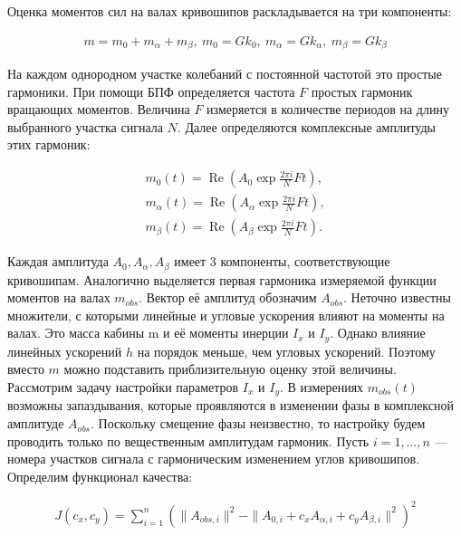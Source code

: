 Оценка моментов сил на валах кривошипов раскладывается на три компоненты:

\begin{equation}
\begin{aligned}
	m = m_0 + m_{\alpha} + m_{\beta},~m_0 = Gk_0,~m_{\alpha} = Gk_{\alpha},~m_{\beta} = Gk_{\beta}
\end{aligned}
\end{equation}

На каждом однородном участке колебаний с постоянной частотой это простые гармоники. При помощи БПФ определяется частота $F$ простых гармоник вращающих моментов. Величина $F$ измеряется в количестве периодов на длину выбранного участка сигнала $N$.
Далее определяются комплексные амплитуды этих гармоник:

\begin{equation}
\begin{aligned}
	m_0(t) = \operatorname{Re}\left(A_0 \exp{\frac{2\pi i}{N}Ft}\right),\\
	m_{\alpha}(t) = \operatorname{Re}\left(A_{\alpha} \exp{\frac{2\pi i}{N}Ft}\right),\\
	m_{\beta}(t) = \operatorname{Re}\left(A_{\beta} \exp{\frac{2\pi i}{N}Ft}\right).
\end{aligned}
\end{equation}

Каждая амплитуда $A_0, A_{\alpha}, A_{\beta}$ имеет 3 компоненты, соответствующие кривошипам. Аналогично выделяется первая гармоника измеряемой функции моментов на валах $m_{obs}$. Вектор её амплитуд обозначим $A_{obs}$. Неточно известны множители, с которыми линейные и угловые ускорения влияют на моменты на валах. Это масса кабины m и её моменты инерции $I_x$ и $I_y$. Однако влияние линейных ускорений $h$ на порядок меньше, чем угловых ускорений. Поэтому вместо $m$ можно подставить приблизительную оценку этой величины. Рассмотрим задачу настройки параметров $I_x$ и $I_y$. В измерениях $m_{obs}(t)$ возможны запаздывания, которые проявляются в изменении фазы в комплексной амплитуде $A_{obs}$. Поскольку смещение фазы неизвестно, то настройку будем проводить только по вещественным амплитудам гармоник. Пусть $i = 1,\ldots,n$ — номера участков сигнала с гармоническим изменением углов кривошипов. Определим функционал качества:

\begin{equation}
\begin{aligned}
	J\left(c_x,c_y\right) = \sum^n_{i=1}\left(\|A_{obs,i}\|^2 - \|A_{0,i} + c_xA_{\alpha,i} + c_yA_{\beta,i}\|^2\right)^2
\end{aligned}
\end{equation}

